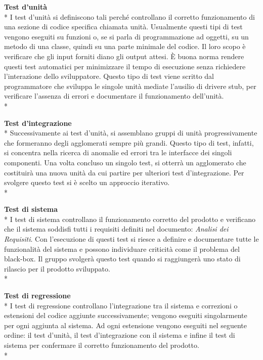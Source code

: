 \textbf{Test d'unità} \\*
I test d'unità si definiscono tali perché controllano il corretto funzionamento di una sezione di codice specifica chiamata unità. Usualmente questi tipi di test vengono eseguiti su funzioni o, se si parla di programmazione ad oggetti, su un metodo di una classe, quindi su una parte minimale del codice. Il loro scopo è verificare che gli input forniti diano gli output attesi. È buona norma rendere questi test automatici per minimizzare il tempo di esecuzione senza richiedere l'interazione dello sviluppatore. Questo tipo di test viene scritto dal programmatore che sviluppa le singole unità mediate l'ausilio di driver\glosp e stub\glo, per verificare l'assenza di errori e documentare il funzionamento dell'unità. \\*


\textbf{Test d'integrazione} \\*
Successivamente ai test d'unità, si assemblano gruppi di unità progressivamente che formeranno degli agglomerati sempre più grandi. Questo tipo di test, infatti, si concentra nella ricerca di anomalie ed errori tra le interfacce dei singoli componenti. Una volta concluso un singolo test, si otterrà un agglomerato che costituirà una nuova unità da cui partire per ulteriori test d'integrazione. Per svolgere questo test si è scelto un approccio iterativo. \\*

\textbf{Test di sistema} \\*
I test di sistema controllano il funzionamento corretto del prodotto e verificano che il sistema soddisfi tutti i requisiti definiti nel documento: \textit{Analisi dei Requisiti}. Con l'esecuzione di questi test si riesce a definire e documentare tutte le funzionalità del sistema e possono individuare criticità come il problema del black-box\glo. Il gruppo svolgerà questo test quando si raggiungerà uno stato di rilascio per il prodotto sviluppato.
\\*

\textbf{Test di regressione} \\*
I test di regressione controllano l'integrazione tra il sistema e correzioni o estensioni del codice aggiunte successivamente; vengono eseguiti singolarmente per ogni aggiunta al sistema. Ad ogni estensione vengono eseguiti nel seguente ordine: il test d'unità, il test d'integrazione con il sistema e infine il test di sistema per confermare il corretto funzionamento del prodotto. \\*

